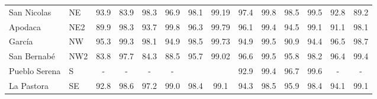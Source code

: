 \begin{table}[H]
\begin{tabular}{llcccccccccccc}
San Nicolas                                                                                  & NE                                         & 93.9       & 83.9      & 98.3       & 96.9       & 98.1                                                 & 99.19                                                & 97.4        & 99.8       & 98.5  & 99.5                                                 & 92.8                                                & 89.2 \\
Apodaca                                                                                      & NE2                                        & 89.9       & 98.3      & 93.7       & 99.8       & 96.3                                                 & 99.79                                                & 96.1        & 99.4       & 94.5  & 99.1                                                 & 91.1                                                & 98.1 \\
García                                                                                       & NW                                         & 95.3       & 99.3      & 98.1       & 94.9       & 98.5                                                 & 99.73                                                & 94.9        & 99.5       & 90.9  & 94.4                                                 & 96.5                                                & 98.7 \\
San Bernabé                                                                                  & NW2                                        & 83.8       & 97.7      & 84.3       & 88.5       & 95.7                                                 & 99.02                                                & 96.6        & 99.5       & 95.8  & 98.2                                                 & 96.4                                                & 99.4 \\
Pueblo Serena                                                                                & S                                          & -          & -         & -          & -          & \cellcolor[HTML]{CB0000}{\color[HTML]{FFFFFF} 22.8}  & \cellcolor[HTML]{CB0000}{\color[HTML]{FFFFFF} 23.69} & 92.9        & 99.4       & 96.7  & 99.6                                                 & -                                                   & -    \\
La Pastora                                                                                   & SE                                         & 92.8       & 98.6      & 97.2       & 99.0       & 98.4                                                 & 99.1                                                 & 94.3        & 98.5       & 95.9  & 98.4                                                 & 94.1                                                & 99.1 \\

\end{tabular}
\end{table}
